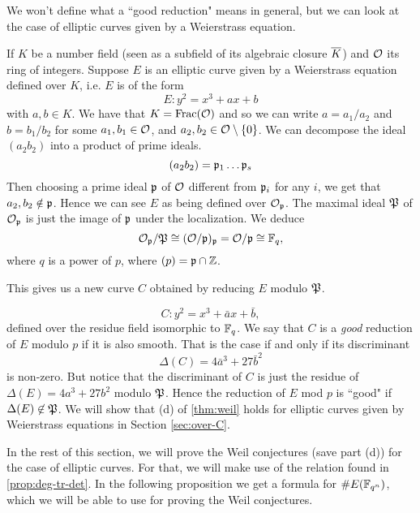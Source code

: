 We won't define what a ``good reduction" means in general, but we can
look at the case of elliptic curves given by a Weierstrass equation.

If $K$ be a number field (seen as a subfield of its algebraic closure $\overline{K}$)
and $\mathcal{O}$ its ring of integers. Suppose $E$ is an elliptic curve given by a
Weierstrass equation defined over $K$, i.e. $E$ is of the form
\begin{equation*}
	E: y^2 = x^3 + ax + b
\end{equation*}
with $a, b \in K$. We have that $K = \operatorname{Frac}(\mathcal{O})$ and so we can write
$a = a_1/a_2$ and $b = b_1/b_2$ for some $a_1, b_1 \in \mathcal{O}$, and
$a_2, b_2 \in \mathcal{O}\setminus\{0\}$.
We can decompose the ideal $(a_2b_2)$ into a product of prime ideals.
\begin{equation*}
	(a_2b_2) = \mathfrak{p}_1\dots\mathfrak{p}_s
\end{equation*}
Then choosing a prime ideal
$\mathfrak{p}$ of $\mathcal{O}$ different from $\mathfrak{p}_i$ for any $i$,
we get that $a_2, b_2 \notin \mathfrak{p}$.
Hence we can see $E$ as being defined over $\mathcal{O}_\mathfrak{p}$.
The maximal ideal $\mathfrak{P}$ of $\mathcal{O}_\mathfrak{p}$ is just the image of $\mathfrak{p}$
under the localization. We deduce
\begin{equation*}
	\mathcal{O}_\mathfrak{p}/\mathfrak{P} \cong (\mathcal{O}/\mathfrak{p})_\mathfrak{p} = \mathcal{O}/\mathfrak{p} \cong \mathbb{F}_q,
\end{equation*}
where $q$ is a power of $p$, where $(p) = \mathfrak{p}\cap\mathbb{Z}$.

This gives us a new curve $C$ obtained by reducing $E$ modulo $\mathfrak{P}$.

\begin{equation*}
	C: y^2 = x^3 + \bar{a}x + \bar{b},
\end{equation*}
defined over the residue field isomorphic to $\mathbb{F}_q$.
We say that $C$ is a \emph{good} reduction of $E$ modulo $p$
if it is also smooth. That is the case if and only if its discriminant
\begin{equation*}
	\Delta(C) = 4\bar{a}^3 + 27\bar{b}^2
\end{equation*}
is non-zero. But notice that the discriminant of $C$ is just the residue
of $\Delta(E) = 4a^3 + 27b^2$ modulo $\mathfrak{P}$.
Hence the reduction of $E$ mod $p$ is ``good" if $\Delta(E) \not\in \mathfrak{P}$.
We will show that (d) of \ref{thm:weil} holds for elliptic curves given
by Weierstrass equations in Section
\ref{sec:over-C}.

In the rest of this section, we will prove the Weil conjectures (save part (d))
for the case
of elliptic curves. For that, we will make use of the relation found in
\ref{prop:deg-tr-det}.
In the following proposition we get a formula for $\#E(\mathbb{F}_{q^n})$, which
we will be able to use for proving the Weil conjectures.

